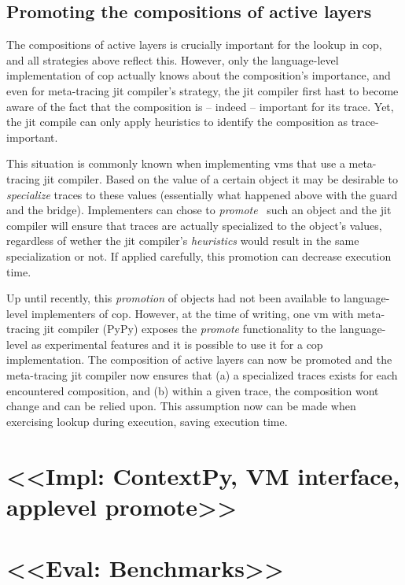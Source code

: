 \documentclass[preprint,english,10pt,nonatbib]{sigplanconf}
\begin{document}
\subsection{Promoting the compositions of active layers}

The compositions of active layers is crucially important for the lookup in
\ac{cop}, and all strategies above reflect this. However, only the
language-level implementation of \ac{cop} actually knows about the
composition's importance, and even for meta-tracing \ac{jit} compiler's
strategy, the \ac{jit} compiler first hast to become aware of the fact that the
composition is \--- indeed \--- important for its trace. Yet, the \ac{jit}
compile can only apply heuristics to identify the composition as
trace-important.

This situation is commonly known when implementing \acp{vm} that use a
meta-tracing \ac{jit} compiler. Based on the value of a certain object it may
be desirable to \emph{specialize} traces to these values (essentially what
happened above with the guard and the bridge).
Implementers can chose to \emph{promote}~\cite[\S
3.1]{bolz+:2011:runtime-feedback} such an object and the \ac{jit} compiler will
ensure that traces are actually specialized to the object's values,  regardless
of wether the \ac{jit} compiler's \emph{heuristics} would result in the same
specialization or not. If applied carefully, this promotion can decrease
execution time.

Up until recently, this \emph{promotion} of objects had not been available to
language-level implementers of \ac{cop}. However, at the time of writing, one
\ac{vm} with meta-tracing \ac{jit} compiler (PyPy) exposes the \emph{promote}
functionality to the language-level as experimental features and it is possible
to use it for a \ac{cop} implementation. The composition of active layers can
now be promoted and the meta-tracing \ac{jit} compiler now ensures that (a) a
specialized traces exists for each encountered composition, and (b) within a
given trace, the composition wont change and can be relied upon. This
assumption now can be made when exercising lookup during execution, saving
execution time.


\section{<<Impl: ContextPy, VM interface, applevel promote>>}


\section{<<Eval: Benchmarks>>}
\end{document}
